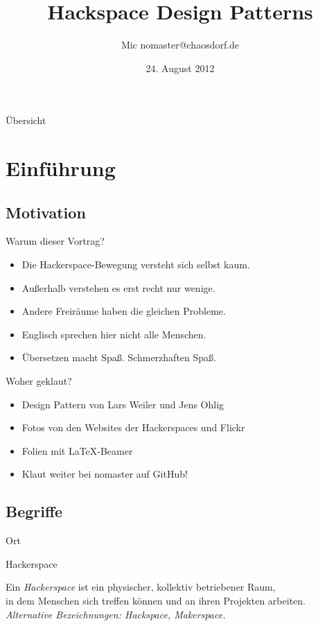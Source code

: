 \documentclass[aspectratio=1610]{beamer}
\title{Hackspace Design Patterns}
\author[Mic]{Mic \flq nomaster@chaosdorf.de\frq}
\institute[chaosdorf]{Chaos Computer Club Düsseldorf / Chaosdorf e.V.}
\date[]{24. August 2012}
\newcommand{\concept}[2]{
  \begin{block}{#1}
    \pause
    #2
  \end{block}
}
\begin{document}
  \begin{frame}
    \titlepage
  \end{frame}

  \begin{frame}{Übersicht}
    \tableofcontents
  \end{frame}

  \section{Einführung}

  \subsection{Motivation}

  \begin{frame}{Warum dieser Vortrag?}
    \begin{itemize}
    \item Die Hackerspace-Bewegung versteht sich selbst kaum.
    \pause
    \item Außerhalb verstehen es erst recht nur wenige.
    \pause
    \item Andere Freiräume haben die gleichen Probleme.
    \pause
    \item Englisch sprechen hier nicht alle Menschen.
    \pause
    \item Übersetzen macht Spaß. Schmerzhaften Spaß.
    \end{itemize}
  \end{frame}

  \begin{frame}{Woher geklaut?}
    \begin{itemize}
      \item Design Pattern von Lars Weiler und Jens Ohlig
      \item Fotos von den Websites der Hackerspaces und Flickr
      \item Folien mit \LaTeX-Beamer
      \item Klaut weiter bei nomaster auf GitHub!
    \end{itemize}
  \end{frame}

  \subsection{Begriffe}

  \begin{frame}{Ort}
    \concept{Hackerspace}{
      Ein \textsl{Hackerspace} ist ein physischer, kollektiv betriebener Raum,\\
      in dem Menschen sich treffen können und an ihren Projekten arbeiten.\\
      \pause
      \textsl{Alternative Bezeichnungen: Hackspace, Makerspace.}
    }
  \end{frame}
\end{document}
